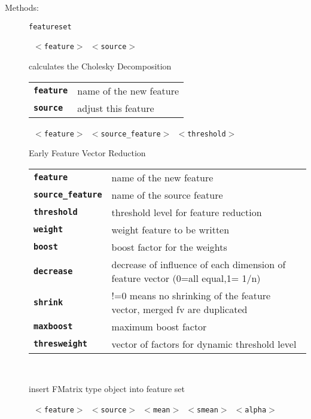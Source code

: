 \begin{description}
\vspace{3mm} \item[Methods:] \texttt{featureset}

    \begin{description}
       \texttt{ $<$feature$>$ $<$source$>$} \

        calculates the Cholesky Decomposition

      \begin{tabular}{ll}
 \texttt{\textbf{feature}} &  name of the new feature \\
 \texttt{\textbf{source}} &   adjust this feature \\
      \end{tabular}
       \texttt{ $<$feature$>$ $<$source\_feature$>$ $<$threshold$>$      } \

        Early Feature Vector Reduction

      \begin{tabular}{ll}
 \texttt{\textbf{feature}} &         name of the new feature \\
 \texttt{\textbf{source\_feature}} &  name of the source feature \\
 \texttt{\textbf{threshold}} &       threshold level for feature reduction  \\
 \texttt{\textbf{weight}} &           weight feature to be written \\
 \texttt{\textbf{boost}} &            boost factor for the weights  \\
 \texttt{\textbf{decrease}} &         decrease of influence of each dimension of feature vector (0=all equal,1= 1/n)  \\
 \texttt{\textbf{shrink}} &           !=0 means no shrinking of the feature vector, merged fv are duplicated  \\
 \texttt{\textbf{maxboost}} &         maximum boost factor  \\
 \texttt{\textbf{thresweight}} &      vector of factors for dynamic threshold level \\
      \end{tabular}
       \texttt{} \

        insert FMatrix type object into feature set

       \texttt{ $<$feature$>$ $<$source$>$ $<$mean$>$ $<$smean$>$ $<$alpha$>$  } \


\end{description}
\end{description}
